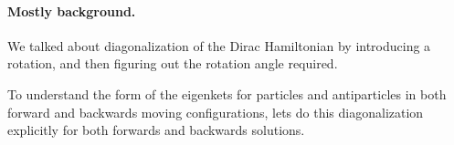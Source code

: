 %
%

\paragraph{Mostly background.}

We talked about diagonalization of the Dirac Hamiltonian by introducing a rotation, and then figuring out the rotation angle required.

To understand the form of the eigenkets for particles and antiparticles in both forward and backwards moving configurations, lets do this diagonalization explicitly for both forwards and backwards solutions.

